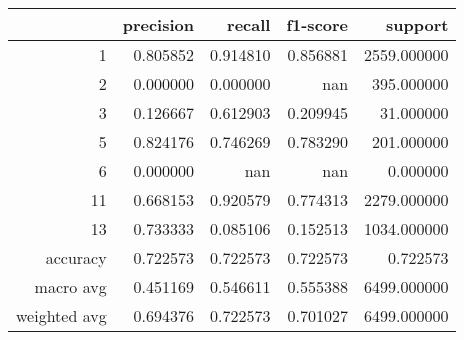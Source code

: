 \begin{tabular}{rrrrr}
\toprule
 & precision & recall & f1-score & support \\
\midrule
1 & 0.805852 & 0.914810 & 0.856881 & 2559.000000 \\
2 & 0.000000 & 0.000000 & nan & 395.000000 \\
3 & 0.126667 & 0.612903 & 0.209945 & 31.000000 \\
5 & 0.824176 & 0.746269 & 0.783290 & 201.000000 \\
6 & 0.000000 & nan & nan & 0.000000 \\
11 & 0.668153 & 0.920579 & 0.774313 & 2279.000000 \\
13 & 0.733333 & 0.085106 & 0.152513 & 1034.000000 \\
accuracy & 0.722573 & 0.722573 & 0.722573 & 0.722573 \\
macro avg & 0.451169 & 0.546611 & 0.555388 & 6499.000000 \\
weighted avg & 0.694376 & 0.722573 & 0.701027 & 6499.000000 \\
\bottomrule
\end{tabular}
